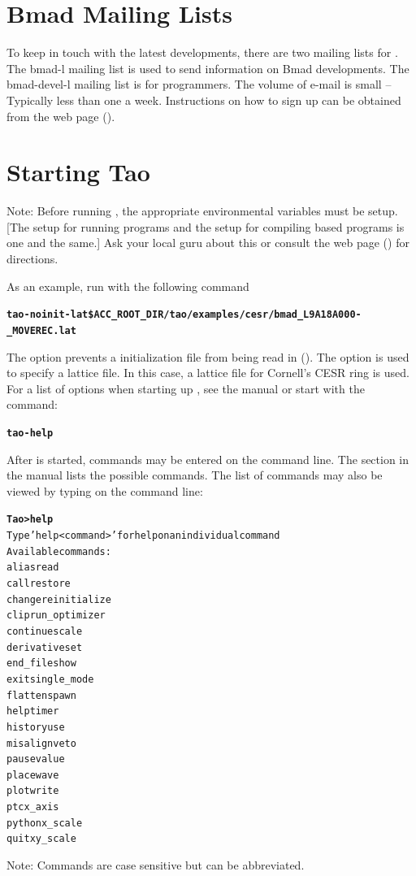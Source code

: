 \documentclass{hitec}
\newcommand{\BF}[1]{{\normalfont\textbf{#1}}}
\newenvironment{display}
  {\vspace*{-1.5ex} \begin{alltt}}
  {\end{alltt} \vspace*{-1.0ex}}
\begin{document}
\section{Bmad Mailing Lists}

To keep in touch with the latest \bmad developments, there are two mailing lists for
\bmad.  The bmad-l mailing list is used to send information on Bmad developments.  The
bmad-devel-l mailing list is for programmers. The volume of e-mail is small -- Typically
less than one a week. Instructions on how to sign up can be obtained from the \bmad web
page ().

\section{Starting Tao}
\label{s:starting.tao}

Note: Before running \tao, the appropriate environmental variables must be setup.
[The setup for running programs and the setup for compiling \bmad based programs is one
and the same.] Ask your local \bmad guru about this or consult the \bmad web page
() for directions.

As an example, run \tao with the following command
\begin{display}
  \BF{tao -noinit -lat \$ACC_ROOT_DIR/tao/examples/cesr/bmad_L9A18A000-_MOVEREC.lat}
\end{display}
The  option prevents a \tao initialization file from being read in
(). The  option is used to specify a lattice file. In this case,
a lattice file for Cornell's CESR ring is used. For a list of options when starting up
\tao, see the \tao manual or start \tao with the command:
\begin{display}
  \BF{tao -help}
\end{display}

After \tao is started, commands may be entered on the command line. The section
\tao {} in the \tao manual lists the possible commands. The list
of commands may also be viewed by typing  on the command line:
\begin{display}
  \BF{Tao> help}
  Type 'help <command>' for help on an individual command
  Available commands:
    alias                             read
    call                              restore
    change                            reinitialize
    clip                              run_optimizer
    continue                          scale
    derivative                        set
    end_file                          show
    exit                              single_mode
    flatten                           spawn
    help                              timer
    history                           use
    misalign                          veto
    pause                             value
    place                             wave
    plot                              write
    ptc                               x_axis
    python                            x_scale
    quit                              xy_scale
\end{display}
Note: Commands are case sensitive but can be abbreviated.
\end{document}
